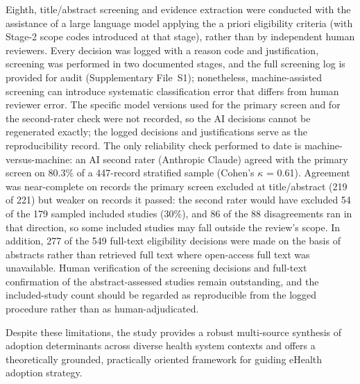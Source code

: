 Eighth, title/abstract screening and evidence extraction were conducted with the assistance of a large language model applying the a priori eligibility criteria (with Stage-2 scope codes introduced at that stage), rather than by independent human reviewers. Every decision was logged with a reason code and justification, screening was performed in two documented stages, and the full screening log is provided for audit (Supplementary File~S1); nonetheless, machine-assisted screening can introduce systematic classification error that differs from human reviewer error. The specific model versions used for the primary screen and for the second-rater check were not recorded, so the AI decisions cannot be regenerated exactly; the logged decisions and justifications serve as the reproducibility record. The only reliability check performed to date is machine-versus-machine: an AI second rater (Anthropic Claude) agreed with the primary screen on 80.3\% of a 447-record stratified sample (Cohen's $\kappa$ = 0.61). Agreement was near-complete on records the primary screen excluded at title/abstract (219 of 221) but weaker on records it passed: the second rater would have excluded 54 of the 179 sampled included studies (30\%), and 86 of the 88 disagreements ran in that direction, so some included studies may fall outside the review's scope. %
In addition, 277 of the 549 full-text eligibility decisions were made on the basis of abstracts rather than retrieved full text where open-access full text was unavailable. Human verification of the screening decisions and full-text confirmation of the abstract-assessed studies remain outstanding, and the included-study count should be regarded as reproducible from the logged procedure rather than as human-adjudicated.

Despite these limitations, the study provides a robust multi-source synthesis of adoption determinants across diverse health system contexts and offers a theoretically grounded, practically oriented framework for guiding eHealth adoption strategy.
